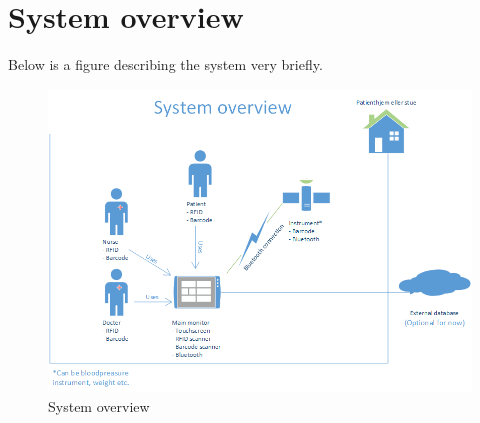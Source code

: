 \section{System overview}
Below is a figure describing the system very briefly.
\begin{figure}[H]
\centering
\includegraphics[width=.7\textwidth]{billeder/systemoversigt}
\caption{System overview}
\end{figure}












